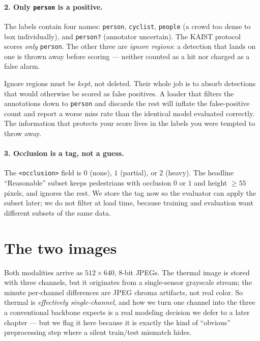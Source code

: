 \documentclass[../main.tex]{subfiles}
\begin{document}
\paragraph{2. Only \texttt{person} is a positive.} The labels contain four names:
\texttt{person}, \texttt{cyclist}, \texttt{people} (a crowd too dense to box individually),
and \texttt{person?} (annotator uncertain). The KAIST protocol scores \emph{only}
\texttt{person}. The other three are \emph{ignore regions}: a detection that lands on one is
thrown away before scoring --- neither counted as a hit nor charged as a false alarm.

\begin{lesson}
Ignore regions must be \emph{kept}, not deleted. Their whole job is to absorb detections
that would otherwise be scored as false positives. A loader that filters the annotations
down to \texttt{person} and discards the rest will inflate the false-positive count and
report a worse miss rate than the identical model evaluated correctly. The information that
protects your score lives in the labels you were tempted to throw away.
\end{lesson}

\paragraph{3. Occlusion is a tag, not a guess.} The \texttt{<occlusion>} field is
$0$ (none), $1$ (partial), or $2$ (heavy). The headline ``Reasonable'' subset keeps
pedestrians with occlusion $0$ or $1$ and height $\geq 55$ pixels, and ignores the rest.
We store the tag now so the evaluator can apply the subset later; we do not filter at load
time, because training and evaluation want different subsets of the same data.

\section{The two images}

Both modalities arrive as $512\times640$, 8-bit JPEGs. The thermal image is stored with
three channels, but it originates from a single-sensor grayscale stream; the minute
per-channel differences are JPEG chroma artifacts, not real color. So thermal is
\emph{effectively single-channel}, and how we turn one channel into the three a
conventional backbone expects is a real modeling decision we defer to a later chapter --- but
we flag it here because it is exactly the kind of ``obvious'' preprocessing step where a
silent train/test mismatch hides.
\end{document}
